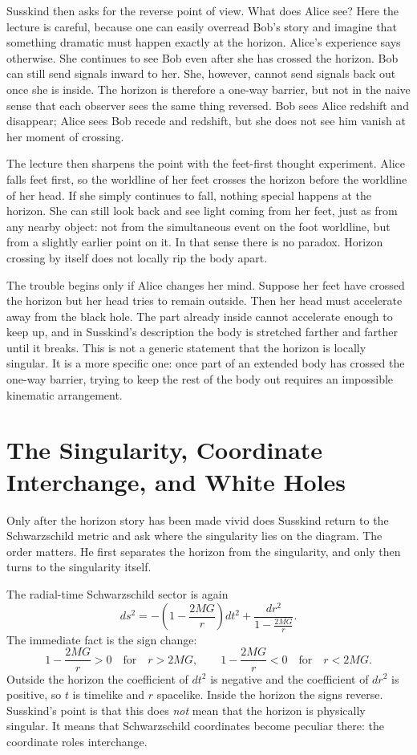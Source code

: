 Susskind then asks for the reverse point of view. What does Alice see? Here the lecture is careful, because one can easily overread Bob's story and imagine that something dramatic must happen exactly at the horizon. Alice's experience says otherwise. She continues to see Bob even after she has crossed the horizon. Bob can still send signals inward to her. She, however, cannot send signals back out once she is inside. The horizon is therefore a one-way barrier, but not in the naive sense that each observer sees the same thing reversed. Bob sees Alice redshift and disappear; Alice sees Bob recede and redshift, but she does not see him vanish at her moment of crossing.

The lecture then sharpens the point with the feet-first thought experiment. Alice falls feet first, so the worldline of her feet crosses the horizon before the worldline of her head. If she simply continues to fall, nothing special happens at the horizon. She can still look back and see light coming from her feet, just as from any nearby object: not from the simultaneous event on the foot worldline, but from a slightly earlier point on it. In that sense there is no paradox. Horizon crossing by itself does not locally rip the body apart.

The trouble begins only if Alice changes her mind. Suppose her feet have crossed the horizon but her head tries to remain outside. Then her head must accelerate away from the black hole. The part already inside cannot accelerate enough to keep up, and in Susskind's description the body is stretched farther and farther until it breaks. This is not a generic statement that the horizon is locally singular. It is a more specific one: once part of an extended body has crossed the one-way barrier, trying to keep the rest of the body out requires an impossible kinematic arrangement.

\section{The Singularity, Coordinate Interchange, and White Holes}

Only after the horizon story has been made vivid does Susskind return to the Schwarzschild metric and ask where the singularity lies on the diagram. The order matters. He first separates the horizon from the singularity, and only then turns to the singularity itself.

The radial-time Schwarzschild sector is again
\begin{equation}
ds^2=-\left(1-\frac{2MG}{r}\right)dt^2+\frac{dr^2}{1-\frac{2MG}{r}}.
\end{equation}
The immediate fact is the sign change:
\begin{equation}
1-\frac{2MG}{r}>0 \quad \text{for} \quad r>2MG,
\qquad
1-\frac{2MG}{r}<0 \quad \text{for} \quad r<2MG.
\end{equation}
Outside the horizon the coefficient of \(dt^2\) is negative and the coefficient of \(dr^2\) is positive, so \(t\) is timelike and \(r\) spacelike. Inside the horizon the signs reverse. Susskind's point is that this does \emph{not} mean that the horizon is physically singular. It means that Schwarzschild coordinates become peculiar there: the coordinate roles interchange.

